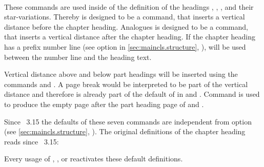 \begin{Declaration}
  \\
  \\
  \\
  \\
  \\
  \\
\end{Declaration}
%
%
%
%
%
%
%
These commands are used inside of the definition of the headings
, , ,
 and their star-variations. Thereby
 is designed to be a command, that inserts a
vertical distance before the chapter heading. Analogues
 is designed to be a command, that inserts a vertical
distance after the chapter heading. If the chapter heading has a prefix number line (see option
 in \autoref{sec:maincls.structure},
), 
will be used between the number line and the heading text.

Vertical distance above and below part headings will be inserted using the
commands  and . A page break
would be interpreted to be part of the vertical distance and therefore is
already part of the default of  in
 and
. Command
 is used to produce the empty page after the part heading
page of  and .

Since \KOMAScript~3.15 the defaults of these seven commands are independent from
option  (see
\autoref{sec:maincls.structure},
). The original definitions of the
chapter heading reads since \KOMAScript~3.15:
\begin{lstcode}
  \newcommand*{\chapterheadstartvskip}{\vspace{\@tempskipa}}
  \newcommand*{\chapterheadmidvskip}{\par\nobreak\vskip.5\baselineskip}
  \newcommand*{\chapterheadendvskip}{\vskip\@tempskipa}
\end{lstcode}
Every usage of ,
, or  reactivates
these default definitions.

